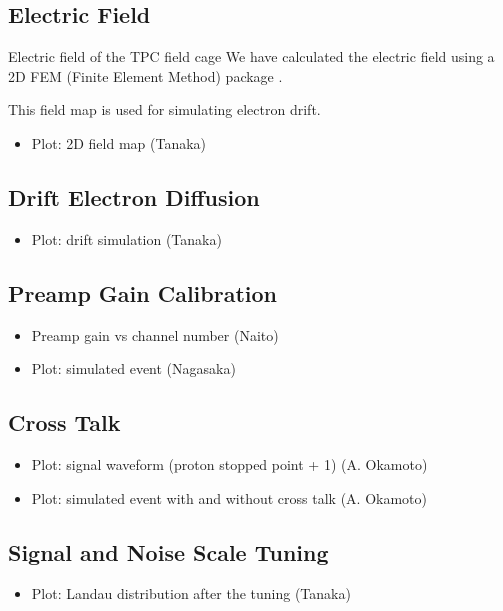 \subsection{Electric Field}

Electric field of the TPC field cage
We have calculated the electric field using a 2D FEM (Finite Element Method) package \cite{Ref:FEMTET}.

This field map is used for simulating electron drift.


\begin{itemize}
\item Plot: 2D field map  (Tanaka)
\end{itemize}

\subsection{Drift Electron Diffusion}
\begin{itemize}
\item Plot: drift simulation  (Tanaka)
\end{itemize}

\subsection{Preamp Gain Calibration}
\begin{itemize}
\item Preamp gain vs channel number  (Naito)
\end{itemize}


\begin{itemize}
\item Plot: simulated event  (Nagasaka)
\end{itemize}

\subsection{Cross Talk}
\begin{itemize}
\item Plot: signal waveform (proton stopped point + 1)  (A. Okamoto)
\item Plot: simulated event with and without cross talk (A. Okamoto)
\end{itemize}

\subsection{Signal and Noise Scale Tuning}
\begin{itemize}
\item Plot: Landau distribution after the tuning  (Tanaka)
\end{itemize}

